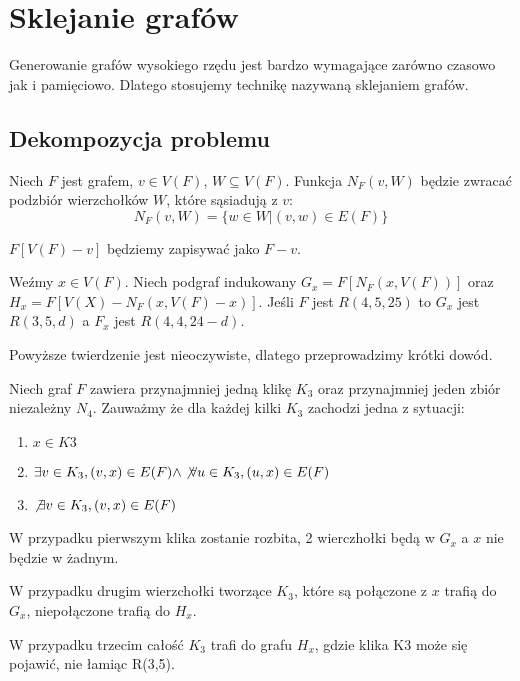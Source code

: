 \section{Sklejanie grafów}

Generowanie grafów wysokiego rzędu jest bardzo wymagające zarówno czasowo jak i pamięciowo. Dlatego stosujemy technikę nazywaną sklejaniem grafów. 

\subsection{Dekompozycja problemu}
\begin{definition}
  Niech $F$ jest grafem, $v \in V(F)$, $W \subseteq V(F)$. 
  Funkcja $N_F(v,W)$ będzie zwracać podzbiór wierzchołków $W$, które sąsiadują z $v$: 
  $$N_F(v,W) = \{w \in W | (v,w) \in E(F)\}$$ 
\end{definition}

\begin{definition}
  $F[V(F) - {v}]$ będziemy zapisywać jako $F - v$.
\end{definition}

\begin{theorem}
  Weźmy $x \in V(F)$. Niech podgraf indukowany $G_x = F[N_F(x,V(F))]$
  oraz $H_x = F[V(X) - N_F(x,V(F) - x)]$. Jeśli $F$ jest $R(4,5,25)$ to 
  $G_x$ jest $R(3,5,d)$ a $F_x$ jest $R(4,4,24-d)$.
\end{theorem}


Powyższe twierdzenie jest nieoczywiste, dlatego przeprowadzimy krótki dowód. 


  Niech graf $F$ zawiera przynajmniej jedną klikę $K_3$ oraz przynajmniej jeden zbiór niezależny $N_4$.
  Zauważmy że dla każdej kilki $K_3$ zachodzi jedna z sytuacji:
  \begin{enumerate}
    \item $x \in K3$
    \item $ \exists v \in K_3, (v, x) \in E(F) \land \not \forall u \in K_3, (u,x) \in E(F)$ 
    \item $\not \exists v \in K_3, (v, x) \in E(F)$
  \end{enumerate} 
  
  W przypadku pierwszym klika zostanie rozbita, 2 wierczhołki będą w $G_x$ a $x$ nie będzie w żadnym.
  
  W przypadku drugim wierzchołki tworzące $K_3$, które są połączone z $x$ trafią do $G_x$, niepołączone trafią do $H_x$.
  
  W przypadku trzecim całość $K_3$ trafi do grafu $H_x$, gdzie klika K3 może się pojawić, nie łamiąc R(3,5).

